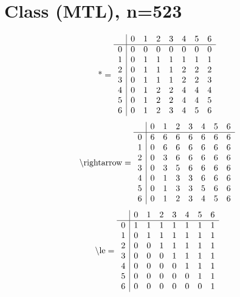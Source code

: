 \documentclass[11pt]{article}
\begin{document}
\section{Class (MTL), n=523}
\[\text{*} = 
\begin{array}{r | r r r r r r r}
 & 0 & 1 & 2 & 3 & 4 & 5 & 6 \\ \hline
0 & 0 & 0 & 0 & 0 & 0 & 0 & 0 \\
1 & 0 & 1 & 1 & 1 & 1 & 1 & 1 \\
2 & 0 & 1 & 1 & 1 & 2 & 2 & 2 \\
3 & 0 & 1 & 1 & 1 & 2 & 2 & 3 \\
4 & 0 & 1 & 2 & 2 & 4 & 4 & 4 \\
5 & 0 & 1 & 2 & 2 & 4 & 4 & 5 \\
6 & 0 & 1 & 2 & 3 & 4 & 5 & 6 \\
\end{array}
\]
\[\text{\textbackslash rightarrow} = 
\begin{array}{r | r r r r r r r}
 & 0 & 1 & 2 & 3 & 4 & 5 & 6 \\ \hline
0 & 6 & 6 & 6 & 6 & 6 & 6 & 6 \\
1 & 0 & 6 & 6 & 6 & 6 & 6 & 6 \\
2 & 0 & 3 & 6 & 6 & 6 & 6 & 6 \\
3 & 0 & 3 & 5 & 6 & 6 & 6 & 6 \\
4 & 0 & 1 & 3 & 3 & 6 & 6 & 6 \\
5 & 0 & 1 & 3 & 3 & 5 & 6 & 6 \\
6 & 0 & 1 & 2 & 3 & 4 & 5 & 6 \\
\end{array}
\]
\[\text{\textbackslash le} = 
\begin{array}{r | r r r r r r r}
 & 0 & 1 & 2 & 3 & 4 & 5 & 6 \\ \hline
0 & 1 & 1 & 1 & 1 & 1 & 1 & 1 \\
1 & 0 & 1 & 1 & 1 & 1 & 1 & 1 \\
2 & 0 & 0 & 1 & 1 & 1 & 1 & 1 \\
3 & 0 & 0 & 0 & 1 & 1 & 1 & 1 \\
4 & 0 & 0 & 0 & 0 & 1 & 1 & 1 \\
5 & 0 & 0 & 0 & 0 & 0 & 1 & 1 \\
6 & 0 & 0 & 0 & 0 & 0 & 0 & 1 \\
\end{array}
\]
\end{document}
